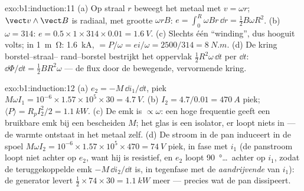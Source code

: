 \begin{solution}{exo:b1:induction:11}
(a) Op straal $r$ beweegt het metaal met $v = \omega r$; $\vect v\wedge\vect B$ is
radiaal, met grootte $\omega rB$: $e = \int_0^R\omega Br\,\dd r = \tfrac12B\omega R^2$.
(b) $\omega = 314$: $e = 0.5 \times 1 \times 314 \times 0.01 = \qty{1.6}{V}$. (c) Slechts één
``winding'', dus hooguit volts; in \qty{1}{m\ohm}: \qty{1.6}{kA}, 
$= P/\omega = ei/\omega = 2500/314 = \qty{8}{N.m}$. (d) De kring borstel--straal--
rand--borstel bestrijkt het oppervlak $\tfrac12R^2\omega\,\dd t$ per $\dd t$: $\dd\Phi/\dd t =
\tfrac12BR^2\omega$ --- de flux door de bewegende, vervormende kring.
\end{solution}

\begin{solution}{exo:b1:induction:12}
(a) $e_2 = -M\,\dd i_1/\dd t$, piek $M\omega I_1 = 10^{-6} \times 1.57 \times 10^5 \times 30 =
\qty{4.7}{V}$. (b) $I_2 = 4.7/0.01 = \qty{470}{A}$ piek; $\langle P\rangle = R_pI_2^2/2
= \qty{1.1}{kW}$. (c) De emk is $\propto\omega$: een hoge frequentie geeft een bruikbare
emk bij een bescheiden $M$; het glas is een isolator, er loopt niets in
--- de warmte ontstaat in het metaal zelf. (d) De stroom in de pan induceert in
de spoel $M\omega I_2 = 10^{-6} \times 1.57 \times 10^5 \times 470 = \qty{74}{V}$ piek,
in fase met $i_1$ (de panstroom loopt niet achter op $e_2$, want hij is
resistief, en $e_2$ loopt \qty{90}{\degree}\ldots\ achter op $i_1$, zodat de
teruggekoppelde emk $-M\,\dd i_2/\dd t$ is, in tegenfase met de
\emph{aandrijvende}  van $i_1$): de generator levert $\tfrac12 \times 74 \times 30 =
\qty{1.1}{kW}$ meer --- precies wat de pan dissipeert.
\end{solution}

